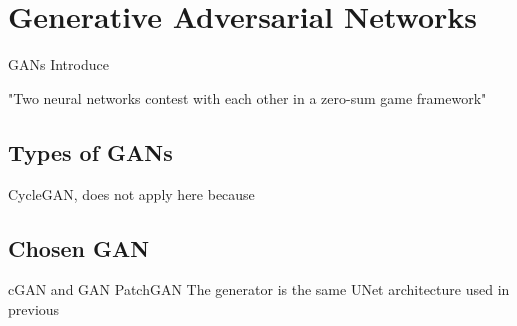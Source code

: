 \chapter{Generative Adversarial Networks}

\aclp{GAN}
Introduce

"Two neural networks contest with each other in a zero-sum game framework"

\section{Types of GANs} 
CycleGAN, does not apply here because

\section{Chosen GAN}
cGAN and GAN
PatchGAN
The generator is the same UNet architecture used in previous


